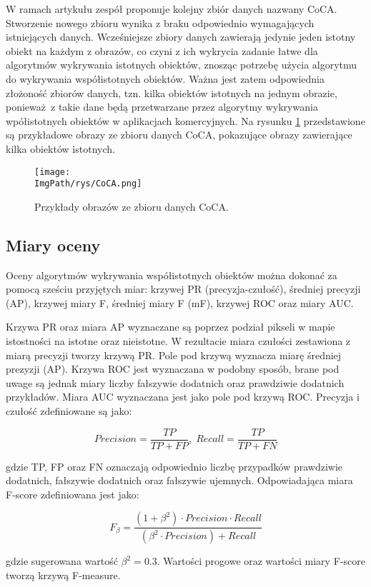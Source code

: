 \documentclass[a4paper,12pt,twoside,openany]{report}
\newcommand{\ImgPath}{.}
\begin{document}
	W ramach artykułu \cite{zhang2020gradientinduced} zespół proponuje kolejny zbiór danych nazwany CoCA. Stworzenie nowego zbioru wynika z braku odpowiednio wymagających istniejących danych. Wcześniejsze zbiory danych zawierają jedynie jeden istotny obiekt na każdym z obrazów, co czyni z ich wykrycia zadanie łatwe dla algorytmów wykrywania istotnych obiektów, znosząc potrzebę użycia algorytmu do wykrywania współistotnych obiektów. Ważna jest zatem odpowiednia złożoność zbiorów danych, tzn. kilka obiektów istotnych na jednym obrazie, ponieważ z takie dane będą przetwarzane przez algorytmy wykrywania wpółistotnych obiektów w aplikacjach komercyjnych. Na rysunku \ref{CoCA} przedstawione są przykładowe obrazy ze zbioru danych CoCA, pokazujące obrazy zawierające kilka obiektów istotnych. 

	\begin{figure}[h]
		\centering
		\texttt{[image: \\ImgPath/rys/CoCA.png]}
		\caption{Przykłady obrazów ze zbioru danych CoCA.}
		\label{CoCA}
	\end{figure}


	\subsection{Miary oceny}
	Oceny algorytmów wykrywania współistotnych obiektów można dokonać za pomocą sześciu przyjętych miar: krzywej PR (precyzja-czułość), średniej precyzji (AP), krzywej miary F, średniej miary F (mF), krzywej ROC oraz miary AUC. 

	Krzywa PR oraz miara AP wyznaczane są poprzez podział pikseli w mapie istostności na istotne oraz nieistotne. W rezultacie miara czułości zestawiona z miarą precyzji tworzy krzywą PR. Pole pod krzywą wyznacza miarę średniej prezyzji (AP). Krzywa ROC jest wyznaczana w podobny sposób, brane pod uwage są jednak miary liczby fałszywie dodatnich oraz prawdziwie dodatnich przykładów. Miara AUC wyznaczana jest jako pole pod krzywą ROC. Precyzja i czułość zdefiniowane są jako:

	$$
		Precision = \frac{TP}{TP + FP}, \; Recall = \frac{TP}{TP + FN}
	$$

	gdzie TP, FP oraz FN oznaczają odpowiednio liczbę przypadków prawdziwie dodatnich, fałszywie dodatnich oraz fałszywie ujemnych. Odpowiadająca miara F-score zdefiniowana jest jako:

	$$
		F_{\beta} = \frac{(1 + \beta^2)\cdot Precision \cdot Recall}{(\beta^2 \cdot Precision) + Recall}
	$$

	gdzie sugerowana wartość $\beta^2 = 0.3$. Wartości progowe oraz wartości miary F-score tworzą krzywą F-measure. 
\end{document}
